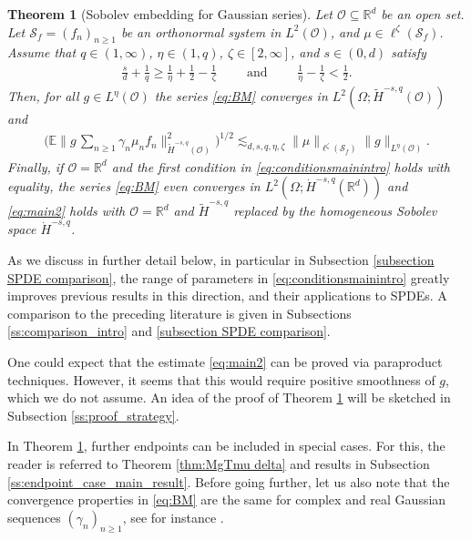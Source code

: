 \documentclass[reqno]{amsart}
\theoremstyle{plain}
\newtheorem{theorem}{Theorem}[section]
\theoremstyle{remark}
\theoremstyle{plain}
\numberwithin{equation}{section}
\def\R{{\mathbb R}}
\newcommand{\E}{{\mathbb E}}
\newcommand{\Domm}{\mathcal{O}}
\newcommand{\wt}{\widetilde}
\newcommand{\1}{\one}
\newcommand{\Sf}{\mathcal{S}_{f}}
\begin{document}
\begin{theorem}[Sobolev embedding for Gaussian series]
\label{thm:intro}
Let $\mathcal{O}\subseteq \R^d$ be an open set. Let $\Sf = (f_n)_{n\geq 1}$ be an orthonormal system in $L^2(\mathcal{O})$, and $\mu\in \ell^\zeta(\Sf)$.
Assume that $q\in (1, \infty)$, $\eta\in (1, q)$, $\zeta\in [2, \infty]$, and $s\in(0,d)$ satisfy 
\begin{align}\label{eq:conditionsmainintro}
\frac{s}{d} + \frac{1}{q}  \geq \frac{1}{\eta} + \frac{1}{2} - \frac{1}{\zeta} \qquad \text{ and } 
\qquad   \frac{1}{\eta} - \frac{1}{\zeta}<\frac12.
\end{align}
Then, for all $g\in L^{\eta}(\mathcal{O})$ 
the series \eqref{eq:BM} converges in $L^2(\Omega;\wt{H}^{-s,q}(\mathcal{O}))$ and 
\begin{align}\label{eq:main2}
\Big(\E\Big\|g\, \sum_{n\geq 1} \gamma_n  \mu_n  f_n \Big\|_{\wt{H}^{-s,q}(\mathcal{O})}^2\Big)^{1/2}
\lesssim_{d,s,q,\eta,\zeta} \|\mu\|_{\ell^{\zeta}(\Sf)} \|g\|_{L^{\eta}(\mathcal{O})}.
\end{align}
Finally, if $\Domm=\R^d$ and the first condition in \eqref{eq:conditionsmainintro} holds with equality, 
the series \eqref{eq:BM} even converges in $L^2(\Omega;\dot{H}^{-s,q}(\R^d))$ and \eqref{eq:main2} holds with $\Domm=\R^d$ and $\wt{H}^{-s,q}$ replaced by the homogeneous Sobolev space $\dot{H}^{-s,q}$.
\end{theorem}
As we discuss in further detail below, in particular in Subsection \ref{subsection SPDE comparison}, the range of parameters in \eqref{eq:conditionsmainintro} greatly improves previous results in this direction, and their applications to SPDEs. A comparison to the preceding literature is given in Subsections \ref{ss:comparison_intro} and \ref{subsection SPDE comparison}.

 One could expect that the estimate \eqref{eq:main2} can be proved via paraproduct techniques. However, it seems that this would require positive smoothness of $g$, which we do not assume. An idea of the proof of Theorem  \ref{thm:intro} will be sketched in Subsection \ref{ss:proof_strategy}.
\smallskip


In Theorem \ref{thm:intro}, further endpoints can be included in special cases. 
For this, the reader is referred to Theorem \ref{thm:MgTmu delta} and results in Subsection \ref{ss:endpoint_case_main_result}. 
Before going further, let us also note that the convergence properties in \eqref{eq:BM} are the same for complex and real Gaussian sequences $(\gamma_n)_{n\geq 1}$, see for instance \cite[Proposition 6.1.21]{HNVW2}.
\end{document}
